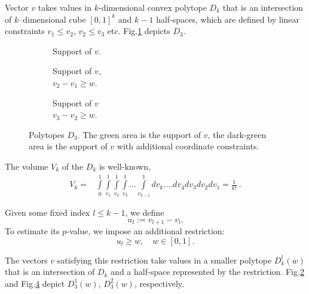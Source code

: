 \documentclass{llncs}
\begin{document}
Vector $v$ takes values in $k$-dimensional convex polytope $D_k$ that is 
an intersection of $k$--dimensional cube $[0, 1]^{k}$ and 
$k-1$ half-spaces, which are defined by linear constraints $v_1 \le v_2$, $v_2 \le v_3$ etc.
Fig.\ref{fig:polytop} depicts $D_3$. 
\begin{figure}
     \centering
     \begin{subfigure}[b]{0.3\textwidth}
         \centering 
         \caption{Support of $v$.
         \\\hspace{\textwidth} 
        }
         \label{fig:polytop}
     \end{subfigure}
     \begin{subfigure}[b]{0.3\textwidth}
         \centering 
         \caption{Support of $v$, 
         \\\hspace{\textwidth}
         $v_2 - v_1 \ge w$.}
         \label{fig:polytop1}
     \end{subfigure}
     \begin{subfigure}[b]{0.3\textwidth}
         \centering 
         \caption{Support of $v$ \\\hspace{\textwidth}$v_3 - v_2 \ge w$.}
         \label{fig:polytop2}
     \end{subfigure}
    \caption{Polytopes $D_3$. The green area is the support of $v$, the dark-green area is the support of $v$ with additional coordinate constraints.}
\end{figure}

The volume $V_k$ of the $D_k$ is well-known,
\begin{eqnarray*}
V_k = &\displaystyle \int\limits_0^1\int\limits_{v_1}^1\int\limits_{v_2}^1\int\limits_{v_3}^1...\int\limits_{v_{k-1}}^1 dv_k....dv_4 dv_3 dv_2 dv_1 =  \frac{1}{k!}~.
\end{eqnarray*}

Given some fixed index $l\leq k-1$, we define
\[
u_{l} := v_{l+1} - v_{l}. 
\]
To estimate its $p$-value, we impose an additional restriction:
\[
u_{l} \ge w, \quad w \in [0, 1].
\]

The vectors $v$ satisfying this restriction take values in a smaller polytope $D^{l}_{k}(w)$ that is an intersection of $D_{k}$ and a half-space represented by the restriction.
Fig.\ref{fig:polytop1} and Fig.\ref{fig:polytop2} depict $D^{1}_{3}(w)$, $D^{2}_{3}(w)$, respectively. 
\end{document}
